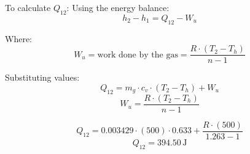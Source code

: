 To calculate \( Q_{12} \):  
Using the energy balance:  
\[ h_2 - h_1 = Q_{12} - W_u \]  

Where:  
\[ W_u = \text{work done by the gas} = \frac{R \cdot (T_2 - T_h)}{n - 1} \]  

Substituting values:  
\[ Q_{12} = m_g \cdot c_v \cdot (T_2 - T_h) + W_u \]  
\[ W_u = \frac{R \cdot (T_2 - T_h)}{n - 1} \]  

\[ Q_{12} = 0.003429 \cdot (500) \cdot 0.633 + \frac{R \cdot (500)}{1.263 - 1} \]  
\[ Q_{12} = 394.50 \, \text{J} \]